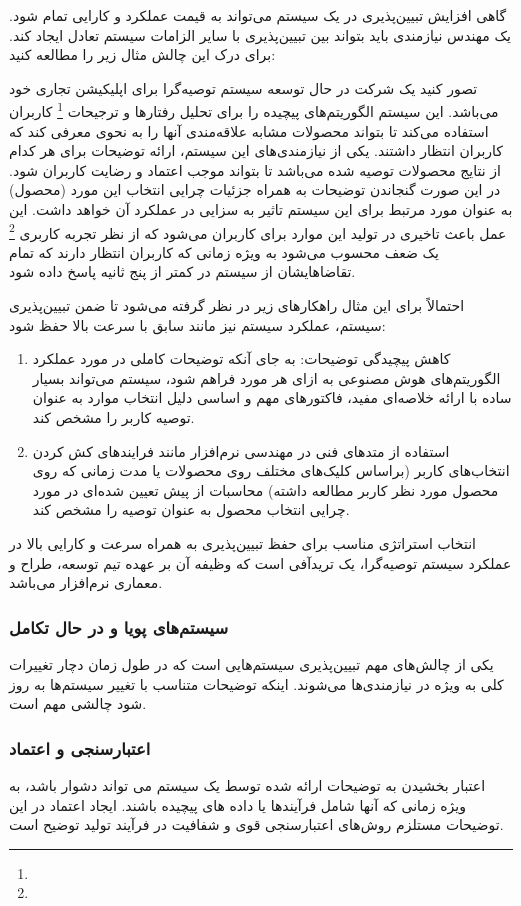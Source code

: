 گاهی افزایش تبیین‌پذیری در یک سیستم می‌تواند به قیمت عملکرد و کارایی تمام شود.
یک مهندس نیازمندی باید بتواند بین تبیین‌پذیری با سایر الزامات سیستم  تعادل  ایجاد کند. برای درک این چالش مثال زیر را مطالعه کنید:

تصور کنید یک شرکت در حال توسعه سیستم توصیه‌گرا برای اپلیکیشن تجاری خود می‌باشد.
این سیستم الگوریتم‌های پیچیده  را برای تحلیل رفتار‌ها و ترجیحات
\footnote{} کاربران استفاده می‌کند تا بتواند محصولات مشابه
علاقه‌مندی آنها را به نحوی معرفی کند که کاربران انتظار داشتند. یکی از
نیازمندی‌های  این سیستم، ارائه توضیحات برای هر کدام از نتایج محصولات
توصیه شده می‌باشد تا بتواند موجب اعتماد و رضایت کاربران شود. در این صورت گنجاندن
توضیحات به همراه جزئیات چرایی انتخاب این مورد (محصول) به عنوان مورد مرتبط برای
این سیستم تاثیر به سزایی در عملکرد آن خواهد داشت. این عمل باعث تاخیری در تولید
این موارد برای کاربران می‌شود که از نظر تجربه کاربری \footnote{} یک ضعف محسوب می‌شود به ویژه زمانی که کاربران انتظار دارند که تمام
تقاضا‌هایشان از سیستم در کمتر از پنج ثانیه پاسخ داده شود.

احتمالاً برای این مثال راهکار‌های زیر در نظر گرفته می‌شود تا ضمن تبیین‌پذیری
سیستم، عملکرد سیستم نیز مانند سابق با سرعت بالا حفظ شود:

\begin{enumerate}
    \item کاهش پیچیدگی توضیحات: به جای آنکه توضیحات کاملی در مورد عملکرد
    الگوریتم‌های هوش مصنوعی به ازای هر مورد فراهم شود، سیستم می‌تواند بسیار ساده
    با ارائه خلاصه‌ای مفید، فاکتور‌های مهم و اساسی دلیل انتخاب موارد به عنوان
    توصیه کاربر را مشخص کند.
    \item استفاده از متد‌های فنی در مهندسی نرم‌افزار مانند فرایند‌های کش کردن
    انتخاب‌های کاربر (براساس کلیک‌های مختلف روی محصولات یا مدت زمانی که روی
    محصول مورد نظر کاربر مطالعه داشته) محاسبات از پیش تعیین شده‌ای در مورد چرایی
    انتخاب محصول به عنوان توصیه را مشخص کند.
\end{enumerate}

انتخاب استراتژی مناسب برای حفظ تبیین‌پذیری به همراه سرعت و کارایی بالا در عملکرد
سیستم توصیه‌گرا، یک تریدآفی است که وظیفه آن بر عهده تیم توسعه، طراح و معماری
نرم‌افزار می‌باشد.

\subsubsection{سیستم‌های پویا و در حال تکامل}

یکی از چالش‌های مهم تبیین‌پذیری سیستم‌هایی است که در طول زمان دچار تغییرات کلی
به ویژه در نیازمندی‌ها می‌شوند. اینکه توضیحات متناسب با تغییر سیستم‌ها به روز
شود چالشی مهم است.

\subsubsection{اعتبارسنجی و اعتماد}

اعتبار بخشیدن به توضیحات ارائه شده توسط یک سیستم می تواند دشوار باشد، به ویژه
زمانی که آنها شامل فرآیندها یا داده های پیچیده باشند. ایجاد اعتماد در این
توضیحات مستلزم روش‌های اعتبارسنجی قوی و شفافیت در فرآیند تولید توضیح است.